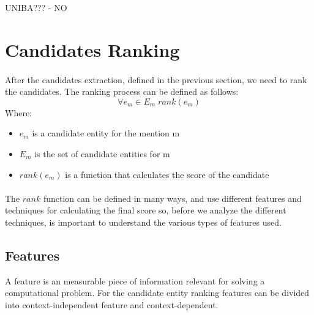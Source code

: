 UNIBA??? - NO

\section{Candidates Ranking}
\paragraph{}
After the candidates extraction, defined in the previous section, we need to rank the candidates. The ranking process can be defined as follows:
\[\forall e_m \in E_m \; rank(e_m)\]
Where:

\begin{itemize}[noitemsep,  topsep=10pt]
\item $e_m$ is a candidate entity for the mention m
\item $E_m$ is the set of candidate entities for m
\item $rank(e_m)$ is a function that calculates the score of the candidate
\end{itemize}

\paragraph{}
The $rank$ function can be defined in many ways, and use different features and techniques for calculating the final score so, before we analyze the different techniques, is important to understand the various types of features used.

\subsection{Features}
A feature is an measurable piece of information relevant for solving a computational problem. For the candidate entity ranking features can be divided into context-independent feature and context-dependent. 

